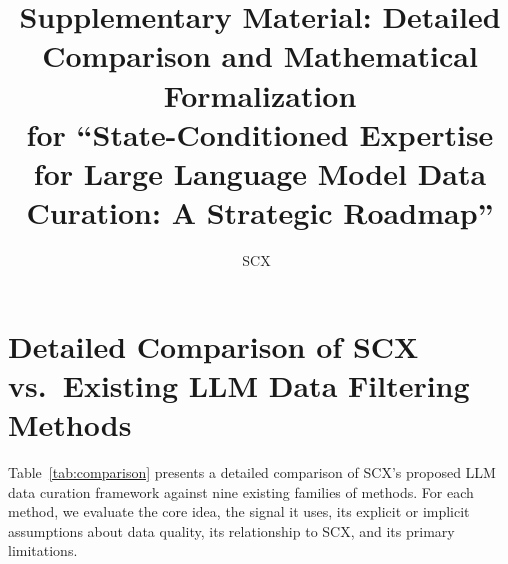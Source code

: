 \documentclass[11pt]{article}
\title{Supplementary Material: Detailed Comparison and Mathematical Formalization\\
       \large for ``State-Conditioned Expertise for Large Language Model Data Curation: A Strategic Roadmap''}
\author{SCX\ }
\begin{document}
\maketitle

\tableofcontents

\newpage

\section{Detailed Comparison of SCX vs.\ Existing LLM Data Filtering Methods}

Table~\ref{tab:comparison} presents a detailed comparison of SCX's proposed LLM data curation framework against nine existing families of methods. For each method, we evaluate the core idea, the signal it uses, its explicit or implicit assumptions about data quality, its relationship to SCX, and its primary limitations.
\end{document}
